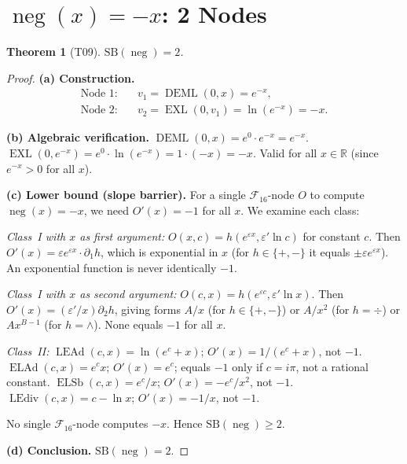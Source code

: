 \documentclass[12pt,a4paper]{article}
\newtheorem{theorem}{Theorem}[section]
\theoremstyle{definition}
\newcommand{\EXL}{\operatorname{EXL}}
\newcommand{\DEML}{\operatorname{DEML}}
\newcommand{\ELAd}{\operatorname{ELAd}}
\newcommand{\ELSb}{\operatorname{ELSb}}
\newcommand{\LEAd}{\operatorname{LEAd}}
\newcommand{\LEdiv}{\operatorname{LEdiv}}
\newcommand{\negop}{\operatorname{neg}}
\newcommand{\SB}{\mathrm{SB}}
\newcommand{\F}{\mathcal{F}_{16}}
\begin{document}
\section{\texorpdfstring{$\negop(x) = -x$}{neg(x)}: 2 Nodes}
\label{sec:neg}

\begin{theorem}[T09]
\label{thm:neg}
$\SB(\negop) = 2$.
\end{theorem}

\begin{proof}
\textbf{(a) Construction.}
\begin{align*}
  \text{Node 1:} &\quad v_1 = \DEML(0,x) = e^{-x}, \\
  \text{Node 2:} &\quad v_2 = \EXL(0,v_1) = \ln(e^{-x}) = -x.
\end{align*}

\textbf{(b) Algebraic verification.}
$\DEML(0,x) = e^0 \cdot e^{-x} = e^{-x}$.
$\EXL(0,e^{-x}) = e^0 \cdot \ln(e^{-x}) = 1\cdot(-x) = -x$.
Valid for all $x\in\mathbb{R}$ (since $e^{-x}>0$ for all $x$).

\textbf{(c) Lower bound (slope barrier).}
For a single $\F$-node $O$ to compute $\negop(x) = -x$, we need
$O'(x) = -1$ for all $x$.  We examine each class:

\emph{Class~I with $x$ as first argument:} $O(x,c) = h(e^{\varepsilon x}, \varepsilon'\ln c)$
for constant $c$.  Then $O'(x) = \varepsilon e^{\varepsilon x} \cdot \partial_1 h$,
which is exponential in $x$ (for $h \in \{+,-\}$ it equals $\pm\varepsilon e^{\varepsilon x}$).
An exponential function is never identically $-1$.

\emph{Class~I with $x$ as second argument:} $O(c,x) = h(e^{\varepsilon c}, \varepsilon'\ln x)$.
Then $O'(x) = (\varepsilon'/x)\partial_2 h$, giving forms $A/x$ (for $h\in\{+,-\}$)
or $A/x^2$ (for $h=\div$) or $A x^{B-1}$ (for $h=\wedge$).
None equals $-1$ for all $x$.

\emph{Class~II:}
$\LEAd(c,x) = \ln(e^c+x)$; $O'(x) = 1/(e^c+x)$, not $-1$.
$\ELAd(c,x) = e^c x$; $O'(x) = e^c$; equals $-1$ only if $c = i\pi$,
not a rational constant.
$\ELSb(c,x) = e^c/x$; $O'(x) = -e^c/x^2$, not $-1$.
$\LEdiv(c,x) = c - \ln x$; $O'(x) = -1/x$, not $-1$.

No single $\F$-node computes $-x$.  Hence $\SB(\negop) \ge 2$.

\textbf{(d) Conclusion.} $\SB(\negop) = 2$.
\end{proof}
\end{document}
